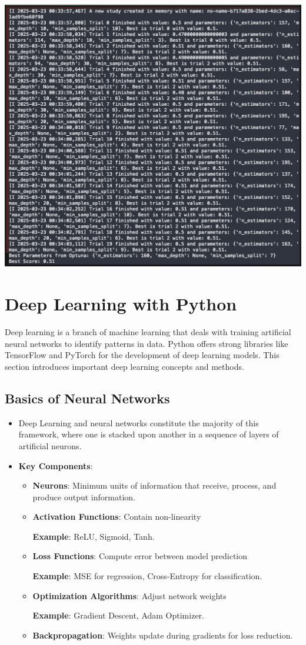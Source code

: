 \documentclass{article}
\begin{document}
\begin{itemize}
\begin{itemize}
\includegraphics[width=14cm,height=8.5
cm]{Automated_Output.png}
    \end{itemize}
\end{itemize}

\newpage
\section{ Deep Learning with Python}
Deep learning is a branch of machine learning that deals with training artificial neural networks to identify patterns in data. Python offers strong libraries like TensorFlow and PyTorch for the development of deep learning models. This section introduces important deep learning concepts and methods.
\subsection{Basics of Neural Networks}
\begin{itemize}
    \item Deep Learning and neural networks constitute the majority of this framework, where one is stacked upon another in a sequence of layers of artificial neurons.
    \item \textbf{Key Components}:
    \begin{itemize}
    \item \textbf{Neurons}: Minimum units of information that receive, process, and produce output information.
    \item \textbf{Activation Functions}: Contain non-linearity 
    
    \textbf{Example}: ReLU, Sigmoid, Tanh.
    \item \textbf{Loss Functions}: Compute error between model prediction 
    
    \textbf{Example}: MSE for regression, Cross-Entropy for classification.
    \item \textbf{Optimization Algorithms}: Adjust network weights
    
    \textbf{Example}: Gradient Descent, Adam Optimizer.
    \item \textbf{Backpropagation}: Weights update during gradients for loss reduction.

    \end{itemize}
\end{itemize}
\end{document}
